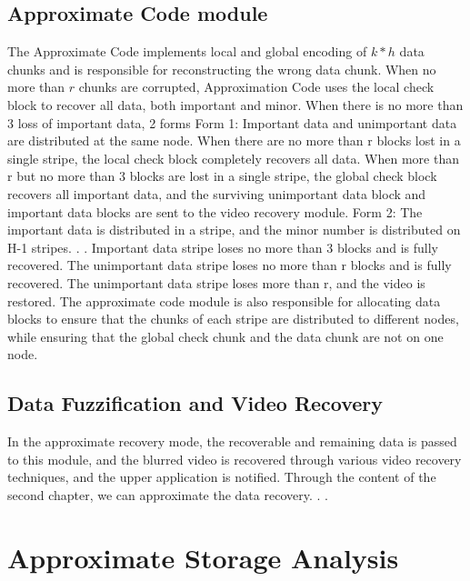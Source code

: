 \documentclass[sigconf]{acmart}
\begin{document}
\subsection{Approximate Code module}
The Approximate Code implements local and global encoding of $k*h$ data chunks and is responsible for reconstructing the wrong data chunk. When no more than $r$ chunks are corrupted, Approximation Code uses the local check block to recover all data, both important and minor. When there is no more than 3 loss of important data,
2 forms
Form 1: Important data and unimportant data are distributed at the same node.
When there are no more than r blocks lost in a single stripe, the local check block completely recovers all data.
When more than r but no more than 3 blocks are lost in a single stripe, the global check block recovers all important data, and the surviving unimportant data block and important data blocks are sent to the video recovery module.
Form 2: The important data is distributed in a stripe, and the minor number is distributed on H-1 stripes. . .
Important data stripe loses no more than 3 blocks and is fully recovered.
The unimportant data stripe loses no more than r blocks and is fully recovered.
The unimportant data stripe loses more than r, and the video is restored.
The approximate code module is also responsible for allocating data blocks to ensure that the chunks of each stripe are distributed to different nodes, while ensuring that the global check chunk and the data chunk are not on one node.

\subsection{Data Fuzzification and Video Recovery}
In the approximate recovery mode, the recoverable and remaining data is passed to this module, and the blurred video is recovered through various video recovery techniques, and the upper application is notified. Through the content of the second chapter, we can approximate the data recovery. . .

\section{Approximate Storage Analysis}\label{as-analysis}
\end{document}
